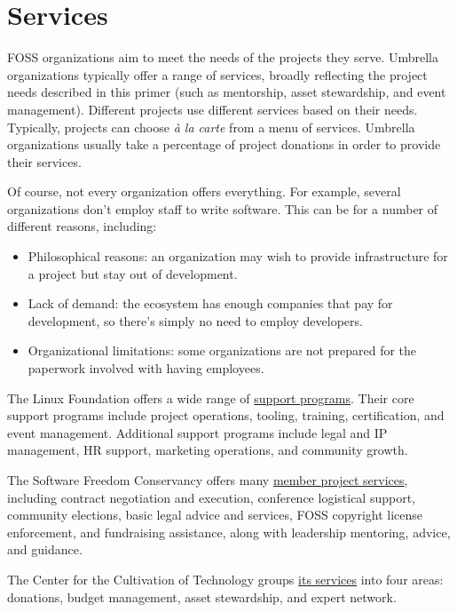 


\chapter{Services}

FOSS organizations aim to meet the needs of the projects they serve.  Umbrella organizations typically offer a range of services, broadly reflecting the project needs described in this primer (such as mentorship, asset stewardship, and event management).  Different projects use different services based on their needs.  Typically, projects can choose \textit{à la carte} from a menu of services.  Umbrella organizations usually take a percentage of project donations in order to provide their services.

Of course, not every organization offers everything.  For example, several organizations don't employ staff to write software.  This can be for a number of different reasons, including:

\begin{itemize}

\itemsep 0.50em

\item Philosophical reasons: an organization may wish to provide infrastructure for a project but stay out of development.
\item Lack of demand: the ecosystem has enough companies that pay for development, so there's simply no need to employ developers.
\item Organizational limitations: some organizations are not prepared for the paperwork involved with having employees.

\end{itemize}

\begin{kaobox}[frametitle=Example services and support programs]

The Linux Foundation offers a wide range of \href{https://www.linuxfoundation.org/en/projects/support-programs/}{support programs}.  Their core support programs include project operations, tooling, training, certification, and event management.  Additional support programs include legal and IP management, HR support, marketing operations, and community growth.

The Software Freedom Conservancy offers many \href{https://sfconservancy.org/projects/services/}{member project services}, including contract negotiation and execution, conference logistical support, community elections, basic legal advice and services, FOSS copyright license enforcement, and fundraising assistance, along with leadership mentoring, advice, and guidance.

The Center for the Cultivation of Technology groups \href{https://techcultivation.org/#overview}{its services} into four areas: donations, budget management, asset stewardship, and expert network.

\end{kaobox}

